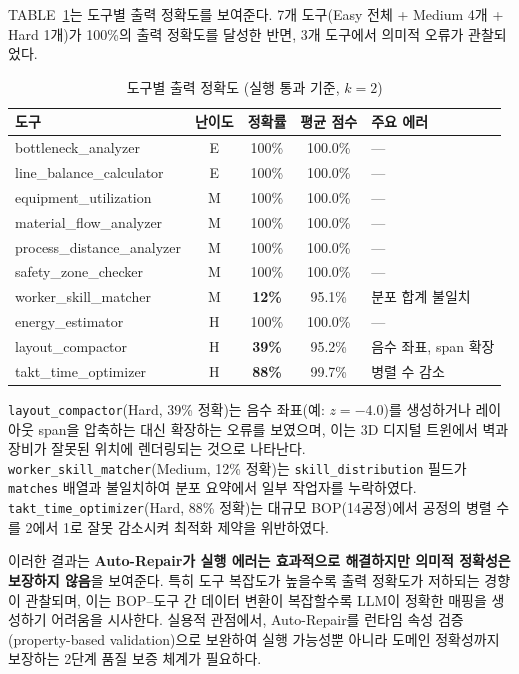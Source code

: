 \documentclass[conference]{IEEEtran}
\begin{document}
TABLE~\ref{tab:tool_accuracy}는 도구별 출력 정확도를 보여준다. 7개 도구(Easy 전체 + Medium 4개 + Hard 1개)가 100\%의 출력 정확도를 달성한 반면, 3개 도구에서 의미적 오류가 관찰되었다.

\begin{table}[!t]
\caption{도구별 출력 정확도 (실행 통과 기준, $k{=}2$)}
\label{tab:tool_accuracy}
\centering
\begin{tabular}{l c c c l}
\hline
\textbf{도구} & \textbf{난이도} & \textbf{정확률} & \textbf{평균 점수} & \textbf{주요 에러} \\
\hline
bottleneck\_analyzer       & E & 100\% & 100.0\% & --- \\
line\_balance\_calculator  & E & 100\% & 100.0\% & --- \\
equipment\_utilization     & M & 100\% & 100.0\% & --- \\
material\_flow\_analyzer   & M & 100\% & 100.0\% & --- \\
process\_distance\_analyzer & M & 100\% & 100.0\% & --- \\
safety\_zone\_checker      & M & 100\% & 100.0\% & --- \\
worker\_skill\_matcher     & M & \textbf{12\%} & 95.1\% & 분포 합계 불일치 \\
energy\_estimator          & H & 100\% & 100.0\% & --- \\
layout\_compactor          & H & \textbf{39\%} & 95.2\% & 음수 좌표, span 확장 \\
takt\_time\_optimizer      & H & \textbf{88\%} & 99.7\% & 병렬 수 감소 \\
\hline
\end{tabular}
\end{table}

\texttt{layout\_compactor}(Hard, 39\% 정확)는 음수 좌표(예: $z = -4.0$)를 생성하거나 레이아웃 span을 압축하는 대신 확장하는 오류를 보였으며, 이는 3D 디지털 트윈에서 벽과 장비가 잘못된 위치에 렌더링되는 것으로 나타난다. \texttt{worker\_skill\_matcher}(Medium, 12\% 정확)는 \texttt{skill\_distribution} 필드가 \texttt{matches} 배열과 불일치하여 분포 요약에서 일부 작업자를 누락하였다. \texttt{takt\_time\_optimizer}(Hard, 88\% 정확)는 대규모 BOP(14공정)에서 공정의 병렬 수를 2에서 1로 잘못 감소시켜 최적화 제약을 위반하였다.

이러한 결과는 \textbf{Auto-Repair가 실행 에러는 효과적으로 해결하지만 의미적 정확성은 보장하지 않음}을 보여준다. 특히 도구 복잡도가 높을수록 출력 정확도가 저하되는 경향이 관찰되며, 이는 BOP--도구 간 데이터 변환이 복잡할수록 LLM이 정확한 매핑을 생성하기 어려움을 시사한다. 실용적 관점에서, Auto-Repair를 런타임 속성 검증(property-based validation)으로 보완하여 실행 가능성뿐 아니라 도메인 정확성까지 보장하는 2단계 품질 보증 체계가 필요하다.
\end{document}
